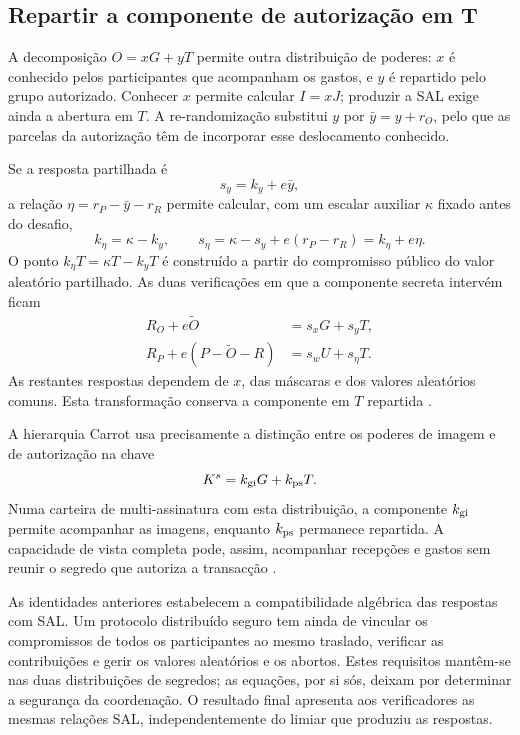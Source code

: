 \subsection{Repartir a componente de autorização em T}

A decomposição \(O=xG+yT\) permite outra distribuição de poderes:
\(x\) é conhecido pelos participantes que acompanham os gastos, e \(y\)
é repartido pelo grupo autorizado. Conhecer \(x\) permite calcular
\(I=xJ\); produzir a SAL exige ainda a abertura em \(T\). A
re-randomização substitui \(y\) por \(\bar y=y+r_O\), pelo que as parcelas
da autorização têm de incorporar esse deslocamento conhecido.

Se a resposta partilhada é
\[
 s_y=k_y+e\bar y,
\]
a relação \(\eta=r_P-\bar y-r_R\) permite calcular, com um escalar auxiliar
\(\kappa\) fixado antes do desafio,
\[
 k_\eta=\kappa-k_y,
 \qquad
 s_\eta=\kappa-s_y+e(r_P-r_R)=k_\eta+e\eta.
\]
O ponto \(k_\eta T=\kappa T-k_yT\) é construído a partir do compromisso
público do valor aleatório partilhado. As duas verificações em que a
componente secreta intervém ficam
\begin{align*}
 R_O+e\widetilde O&=s_xG+s_yT,\\
 R_P+e(P-\widetilde O-R)&=s_wU+s_\eta T.
\end{align*}
As restantes respostas dependem de \(x\), das máscaras e dos valores
aleatórios comuns. Esta transformação conserva a componente em \(T\)
repartida \cite{monero-oxide-fcmp-source}.

A hierarquia Carrot usa precisamente a distinção entre os poderes de imagem
e de autorização na chave
\[
 K^s=k_{\rm gi}G+k_{\rm ps}T.
\]
Numa carteira de multi-assinatura com esta distribuição, a componente
\(k_{\rm gi}\) permite acompanhar as imagens, enquanto
\(k_{\rm ps}\) permanece repartida. A capacidade de vista completa pode,
assim, acompanhar recepções e gastos sem reunir o segredo que autoriza a
transacção \cite{carrot-specification}.

As identidades anteriores estabelecem a compatibilidade algébrica das
respostas com SAL. Um protocolo distribuído seguro tem ainda de vincular os
compromissos de todos os participantes ao mesmo traslado, verificar as
contribuições e gerir os valores aleatórios e os abortos. Estes requisitos
mantêm-se nas duas distribuições de segredos; as equações, por si sós, deixam
por determinar a segurança da coordenação. O resultado final apresenta aos
verificadores as mesmas relações SAL, independentemente do limiar que
produziu as respostas.

